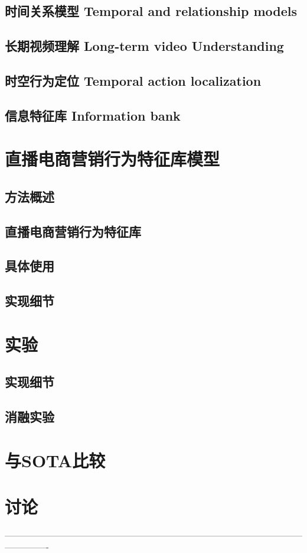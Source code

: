 \subsection{时间关系模型 Temporal and relationship models}

\subsection{长期视频理解 Long-term video Understanding }

\subsection{时空行为定位 Temporal action localization}

\subsection{信息特征库 Information bank}

\section{直播电商营销行为特征库模型}

\subsection{方法概述}

\subsection{直播电商营销行为特征库}

\subsection{具体使用}

\subsection{实现细节}

\section{实验}

\subsection{实现细节}
\subsection{消融实验}

\section{与SOTA比较}
\section{讨论}

----------------------------------------------------------------------------------------------------------------------------
